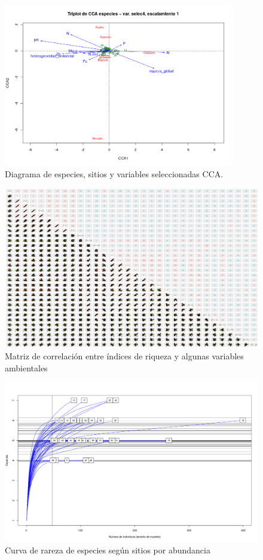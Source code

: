 \documentclass[11pt,]{article}
\begin{document}
\begin{figure}
\centering
\includegraphics[width=0.90000\textwidth]{trip_cca_esca1.png}
\caption{Diagrama de especies, sitios y variables seleccionadas
CCA.\label{fig:esc1cca}}
\end{figure}

\begin{figure}
\centering
\includegraphics[width=1.00000\textwidth]{matriz_ind_var_amb.png}
\caption{Matriz de correlación entre índices de riqueza y algunas
variables
ambientales\label{fig:matriz de correlación de índices _con var amb}}
\end{figure}

\begin{figure}
\centering
\includegraphics[width=1.00000\textwidth]{curva de rareza.png}
\caption{Curva de rareza de especies según sitios por
abundancia\label{fig:curva de rareza}}
\end{figure}
\end{document}
